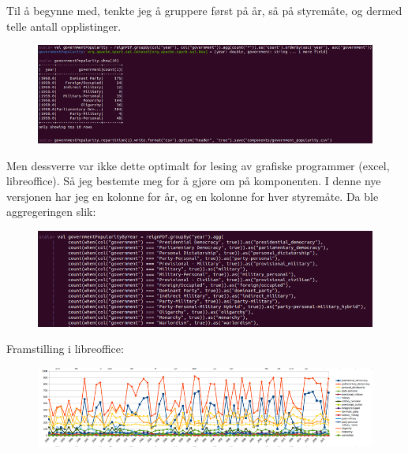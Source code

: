 Til å begynne med, tenkte jeg å gruppere først på år, så på styremåte, og dermed telle antall opplistinger.

\FigureCounter
\begin{figure}[H]
    \includegraphics[width=\textwidth]{images/milepael5/governmentPop.png}
\end{figure}

Men dessverre var ikke dette optimalt for lesing av grafiske programmer (excel, libreoffice). Så jeg bestemte meg for å gjøre om på komponenten. I denne nye versjonen har jeg en kolonne for år, og en kolonne for hver styremåte. Da ble aggregeringen slik:

\FigureCounter
\begin{figure}[H]
    \includegraphics[width=\textwidth]{images/milepael5/govPopByYear.png}
\end{figure}

Framstilling i libreoffice:

\FigureCounter
\begin{figure}[H]
    \includegraphics[width=\textwidth]{images/milepael5/libreOfficeGovPop.png}
\end{figure}